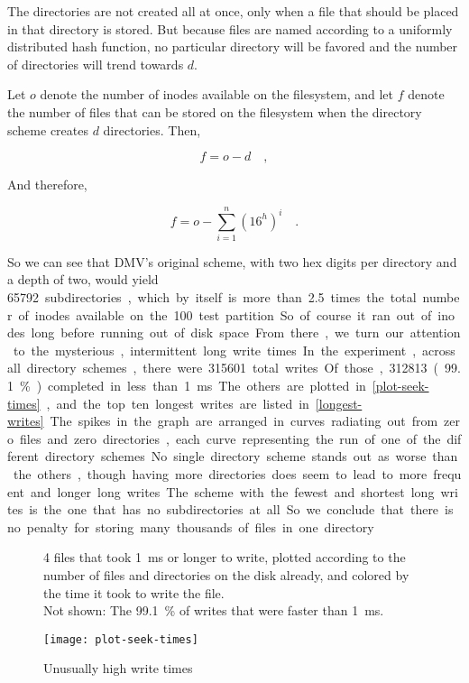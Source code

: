 The directories are not created all at once, only when a file that should be
placed in that directory is stored. But because files are named according to a
uniformly distributed hash function, no particular directory will be favored and
the number of directories will trend towards $d$.

Let $o$ denote the number of inodes available on the filesystem, and let $f$
denote the number of files that can be stored on the filesystem when the
directory scheme creates $d$ directories. Then,

\begin{equation}
    f = o-d \quad,
\end{equation}

And therefore,

\begin{equation}
    f = o - \sum_{i=1}^n \left( 16^h \right)^i \quad.
\end{equation}

So we can see that \gls{DMV}'s original scheme, with two hex digits per
directory and a depth of two, would yield \SI{65792} subdirectories, which by
itself is more than \num{2.5} times the total number of inodes available on the
\SI{100}{\mib} test partition. So of course it ran out of inodes long before
running out of disk space.

From there, we turn our attention to the mysterious, intermittent long write
times. In the experiment, across all directory schemes, there were \num{315601}
total writes. Of those, \num{312813} (\SI{99.1}{\percent}) completed in less
than \SI{1}{\ms}. The others are plotted in \autoref{plot-seek-times}, and the
top ten longest writes are listed in \autoref{longest-writes}. The spikes in the
graph are arranged in curves radiating out from zero files and zero directories,
each curve representing the run of one of the different directory schemes. No
single directory scheme stands out as worse than the others, though having more
directories does seem to lead to more frequent and longer long writes. The
scheme with the fewest and shortest long writes is the one that has no
subdirectories at all. So we conclude that there is no penalty for storing many
thousands of files in one directory.


\begin{figure}[]
    \caption{Unusually high write times}
    \label{plot-seek-times}
    \centering

    \SI{4}{\kib} files that took \SI{1}{\ms} or longer to write, plotted
    according to the number of files and directories on the disk already, and
    colored by the time it took to write the file. \\
    Not shown: The \SI{99.1}{\percent} of writes that were faster than
    \SI{1}{\ms}.

    \texttt{[image: plot-seek-times]}
\end{figure}

